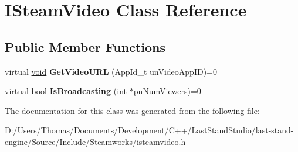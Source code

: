 \hypertarget{classISteamVideo}{}\section{I\+Steam\+Video Class Reference}
\label{classISteamVideo}
\subsection*{Public Member Functions}
\begin{DoxyCompactItemize}
\item 
\hypertarget{classISteamVideo_a552ef1fdc8c22e87a8ba400f738ecbe6}{}virtual \hyperlink{SDL__audio_8h_a52835ae37c4bb905b903cbaf5d04b05f}{void} {\bfseries Get\+Video\+U\+R\+L} (App\+Id\+\_\+t un\+Video\+App\+I\+D)=0\label{classISteamVideo_a552ef1fdc8c22e87a8ba400f738ecbe6}

\item 
\hypertarget{classISteamVideo_a51295a7fbe8cce21c7a63f9633360205}{}virtual bool {\bfseries Is\+Broadcasting} (\hyperlink{SDL__thread_8h_a6a64f9be4433e4de6e2f2f548cf3c08e}{int} $\ast$pn\+Num\+Viewers)=0\label{classISteamVideo_a51295a7fbe8cce21c7a63f9633360205}

\end{DoxyCompactItemize}


The documentation for this class was generated from the following file\+:\begin{DoxyCompactItemize}
\item 
D\+:/\+Users/\+Thomas/\+Documents/\+Development/\+C++/\+Last\+Stand\+Studio/last-\/stand-\/engine/\+Source/\+Include/\+Steamworks/isteamvideo.\+h\end{DoxyCompactItemize}
